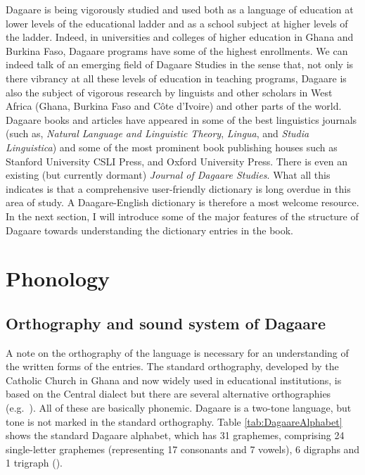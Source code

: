 Dagaare is being vigorously studied and used both as a language of education at lower levels of the educational ladder and as a school subject at higher levels of the ladder. Indeed, in universities and colleges of higher education in Ghana and Burkina Faso, Dagaare programs have some of the highest enrollments. We can indeed talk of an emerging field of Dagaare Studies in the sense that, not only is there vibrancy at all these levels of education in teaching programs, Dagaare is also the subject of vigorous research by linguists and other scholars in West Africa (Ghana, Burkina Faso and C\^{o}te d'Ivoire) and  other parts of the world. Dagaare books and articles have appeared in some of the best linguistics journals (such as, \textit{Natural Language and Linguistic Theory}, \textit{Lingua}, and \textit{Studia Linguistica}) and some of the most prominent book publishing houses such as Stanford University CSLI Press, and Oxford University Press. There is even an existing (but currently dormant) \textit{Journal of Dagaare Studies}. What all this indicates is that a comprehensive user-friendly dictionary is long overdue in this area of study. A Daagare-English dictionary is therefore a most welcome resource. In the next section, I will introduce some of the major features of the structure of Dagaare towards understanding the dictionary entries in the book.


\section{Phonology}

\subsection{Orthography and sound system of Dagaare}

A note on the orthography of the language is necessary for an understanding of the written forms of the entries. The standard orthography, developed by the Catholic Church in Ghana and now widely used in educational institutions, is based on the Central dialect but there are several alternative orthographies (e.g.\  \citealt{Nakuma1999,Nakuma2002}). All of these are basically phonemic. Dagaare is a two-tone language, but tone is not marked in the standard orthography. Table \ref{tab:DagaareAlphabet} shows the standard Dagaare alphabet, which has 31 graphemes, comprising 24 single-letter graphemes (representing 17 consonants and 7 vowels), 6 digraphs and 1 trigraph ().

